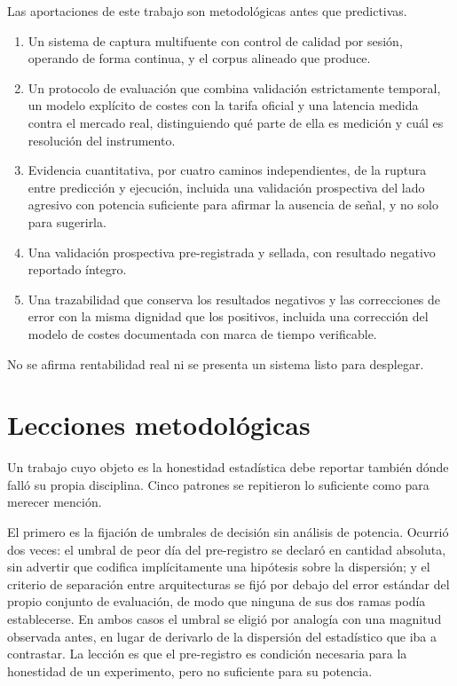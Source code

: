 Las aportaciones de este trabajo son metodológicas antes que predictivas.

\begin{enumerate}[noitemsep]
  \item Un sistema de captura multifuente con control de calidad por sesión, operando de
  forma continua, y el corpus alineado que produce.
  \item Un protocolo de evaluación que combina validación estrictamente temporal, un modelo
  explícito de costes con la tarifa oficial y una latencia medida contra el mercado real,
  distinguiendo qué parte de ella es medición y cuál es resolución del instrumento.
  \item Evidencia cuantitativa, por cuatro caminos independientes, de la ruptura entre
  predicción y ejecución, incluida una validación prospectiva del lado agresivo con
  potencia suficiente para afirmar la ausencia de señal, y no solo para sugerirla.
  \item Una validación prospectiva pre-registrada y sellada, con resultado negativo
  reportado íntegro.
  \item Una trazabilidad que conserva los resultados negativos y las correcciones de error
  con la misma dignidad que los positivos, incluida una corrección del modelo de costes
  documentada con marca de tiempo verificable.
\end{enumerate}

No se afirma rentabilidad real ni se presenta un sistema listo para desplegar.

\section{Lecciones metodológicas}

Un trabajo cuyo objeto es la honestidad estadística debe reportar también dónde falló su
propia disciplina. Cinco patrones se repitieron lo suficiente como para merecer mención.

El primero es la fijación de umbrales de decisión sin análisis de potencia. Ocurrió dos
veces: el umbral de peor día del pre-registro se declaró en cantidad absoluta, sin advertir
que codifica implícitamente una hipótesis sobre la dispersión; y el criterio de separación
entre arquitecturas se fijó por debajo del error estándar del propio conjunto de evaluación,
de modo que ninguna de sus dos ramas podía establecerse. En ambos casos el umbral se eligió
por analogía con una magnitud observada antes, en lugar de derivarlo de la dispersión del
estadístico que iba a contrastar. La lección es que el pre-registro es condición necesaria
para la honestidad de un experimento, pero no suficiente para su potencia.

